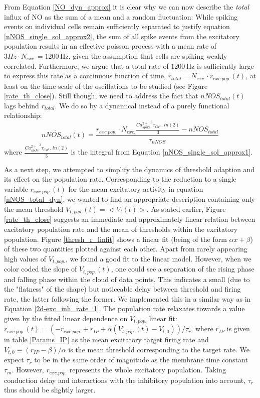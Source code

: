 \documentclass[10pt,a4paper]{article}
\begin{document}
From Equation \eqref{NO_dyn_approx} it is clear why we can now describe the \emph{total} influx of NO as the sum of a mean and a random fluctuation: While spiking events on individual cells remain sufficiently separated to justify equation \eqref{nNOS_single_sol_approx2}, the sum of all spike events from the excitatory population results in an effective poisson process with a mean rate of $3 Hz \cdot N_{exc.} = \mathrm{1200\,Hz}$, given the assumption that cells are spiking weakly correlated. Furthermore, we argue that a total rate of $\mathrm{1200\,Hz}$ is sufficiently large to express this rate as a continuous function of time, $r_{total} = N_{exc.}\cdot r_{exc.pop.}(t)$, at least on the time scale of the oscillations to be studied (see  Figure \ref{rate_th_close}). Still though, we need to address the fact that $nNOS_{total}(t)$ lags behind $r_{total}$. We do so by a dynamical instead of a purely functional relationship:
\begin{equation}
\dot{nNOS_{total}}(t) = \frac{r_{exc.pop.}\cdot N_{exc.}\frac{{Ca^{2+}_{spike}}^3 \tau_{Ca^{2+}}ln(2)}{3} - nNOS_{total}}{\tau_{nNOS}}
\label{nNOS_total_dyn}
\end{equation} 
where $\frac{{Ca^{2+}_{spike}}^3 \tau_{Ca^{2+}}ln(2)}{3}$ is the integral from Equation \eqref{nNOS_single_sol_approx1}.

As a next step, we attempted to simplify the dynamics of threshold adaption and its effect on the population rate. Corresponding to the reduction to a single variable $r_{exc.pop.}(t)$ for the mean excitatory activity in equation \eqref{nNOS_total_dyn}, we wanted to find an appropriate description containing only the mean threshold $V_{t,pop.}(t) = <V_t(t)>$. As stated earlier, Figure \ref{rate_th_close} suggests an immediate and approximately linear relation between excitatory population rate and the mean of thresholds within the excitatory population. Figure \ref{thresh_r_linfit} shows a linear fit (being of the form $\alpha x + \beta$) of these two quantities plotted against each other. Apart from rarely appearing high values of $V_{t,pop.}$, we found a good fit to the linear model. However, when we color coded the slope of $V_{t,pop.}(t)$, one could see a separation of the rising phase and falling phase within the cloud of data points. This indicates a small (due to the "flatness" of the shape) but noticeable delay between threshold and firing rate, the latter following the former. We implemented this in a similar way as in Equation \eqref{2d-exc_inh_rate_1}. The population rate relaxates towards a value given by the fitted linear dependence on $V_{t,pop.}$ linear fit: $\dot{r_{exc.pop.}}(t) = (-r_{exc.pop.} + r_{IP} + \alpha(V_{t,pop.}(t)-V_{t,0}))/\tau_r$, where $r_{IP}$ is given in table \ref{Params_IP} as the mean excitatory target firing rate and $V_{t,0} \equiv (r_{IP}-\beta)/\alpha$ is the mean threshold corresponding to the target rate. We expect $\tau_r$ to be in the same order of magnitude as the membrane time constant $\tau_m$. However, $r_{exc.pop.}$ represents the whole excitatory population. Taking conduction delay and interactions with the inhibitory population into account, $\tau_r$ thus should be slightly larger.
\end{document}
